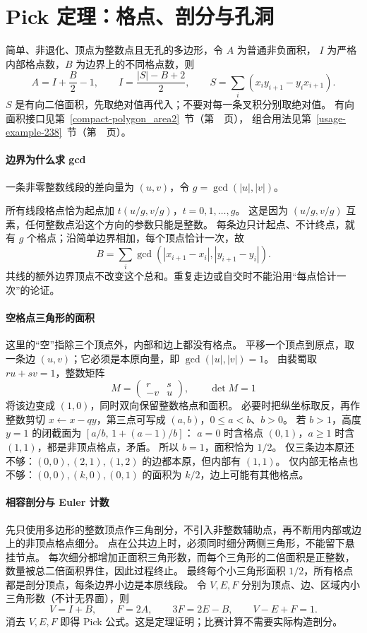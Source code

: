 \section{Pick 定理：格点、剖分与孔洞}\label{knowledge-pick}
简单、非退化、顶点为整数点且无孔的多边形，令 $A$ 为普通非负面积，
$I$ 为严格内部格点数，$B$ 为边界上的不同格点数，则
\[
A=I+\frac B2-1,\qquad I=\frac{|S|-B+2}{2},\qquad
S=\sum_i(x_i y_{i+1}-y_i x_{i+1}).
\]
$S$ 是有向二倍面积，先取绝对值再代入；不要对每一条叉积分别取绝对值。
有向面积接口见第~\ref{compact-polygon_area2}~节（第~\pageref{compact-polygon_area2}~页），
组合用法见第~\ref{usage-example-238}~节（第~\pageref{usage-example-238}~页）。

\paragraph{边界为什么求 gcd}
一条非零整数线段的差向量为 $(u,v)$，令 $g=\gcd(|u|,|v|)$。

所有线段格点恰为起点加 $t(u/g,v/g)$，$t=0,1,\ldots,g$。
这是因为 $(u/g,v/g)$ 互素，任何整数点沿这个方向的参数只能是整数。
每条边只计起点、不计终点，就有 $g$ 个格点；沿简单边界相加，每个顶点恰计一次，故
\[
B=\sum_i\gcd(|x_{i+1}-x_i|,|y_{i+1}-y_i|).
\]
共线的额外边界顶点不改变这个总和。重复走边或自交时不能沿用“每点恰计一次”的论证。

\paragraph{空格点三角形的面积}
这里的“空”指除三个顶点外，内部和边上都没有格点。
平移一个顶点到原点，取一条边 $(u,v)$；它必须是本原向量，即 $\gcd(|u|,|v|)=1$。
由裴蜀取 $ru+sv=1$，整数矩阵
\[
M=\begin{pmatrix}r&s\\-v&u\end{pmatrix},\qquad \det M=1
\]
将该边变成 $(1,0)$，同时双向保留整数格点和面积。
必要时把纵坐标取反，再作整数剪切 $x\gets x-qy$，第三点可写成 $(a,b)$，$0\le a<b$、$b>0$。
若 $b>1$，高度 $y=1$ 的闭截面为 $[a/b,\,1+(a-1)/b]$：
$a=0$ 时含格点 $(0,1)$，$a\ge1$ 时含 $(1,1)$，都是非顶点格点，矛盾。
所以 $b=1$，面积恰为 $1/2$。
仅三条边本原还不够：$(0,0),(2,1),(1,2)$ 的边都本原，但内部有 $(1,1)$。
仅内部无格点也不够：$(0,0),(k,0),(0,1)$ 的面积为 $k/2$，边上可能有其他格点。

\paragraph{相容剖分与 Euler 计数}
先只使用多边形的整数顶点作三角剖分，不引入非整数辅助点，再不断用内部或边上的非顶点格点细分。
点在公共边上时，必须同时细分两侧三角形，不能留下悬挂节点。
每次细分都增加正面积三角形数，而每个三角形的二倍面积是正整数，数量被总二倍面积界住，因此过程终止。
最终每个小三角形面积 $1/2$，所有格点都是剖分顶点，每条边界小边是本原线段。
令 $V,E,F$ 分别为顶点、边、区域内小三角形数（不计无界面），则
\[
V=I+B,\qquad F=2A,\qquad 3F=2E-B,\qquad V-E+F=1.
\]
消去 $V,E,F$ 即得 Pick 公式。这是定理证明；比赛计算不需要实际构造剖分。

